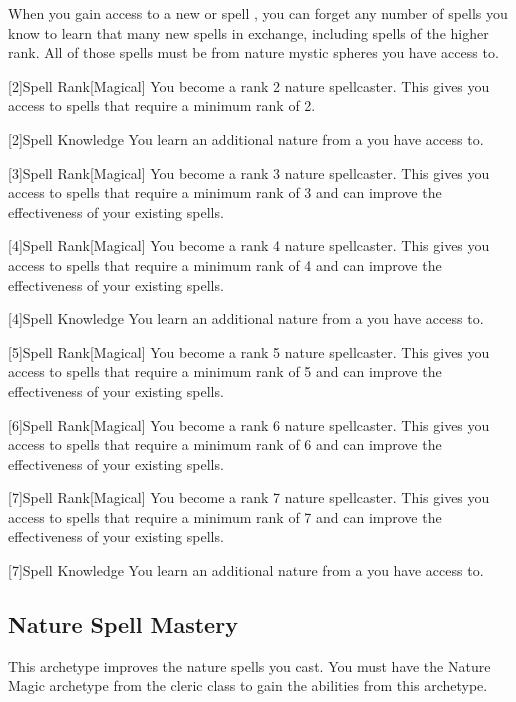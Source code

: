         When you gain access to a new  or spell ,
            you can forget any number of spells you know to learn that many new spells in exchange,
            including spells of the higher rank.
        All of those spells must be from nature mystic spheres you have access to.

        [2]{Spell Rank}[Magical] You become a rank 2 nature spellcaster.
        This gives you access to spells that require a minimum rank of 2.

        [2]{Spell Knowledge} You learn an additional nature  from a  you have access to.

        [3]{Spell Rank}[Magical] You become a rank 3 nature spellcaster.
        This gives you access to spells that require a minimum rank of 3 and can improve the effectiveness of your existing spells.

        [4]{Spell Rank}[Magical] You become a rank 4 nature spellcaster.
        This gives you access to spells that require a minimum rank of 4 and can improve the effectiveness of your existing spells.

        [4]{Spell Knowledge} You learn an additional nature  from a  you have access to.

        [5]{Spell Rank}[Magical] You become a rank 5 nature spellcaster.
        This gives you access to spells that require a minimum rank of 5 and can improve the effectiveness of your existing spells.

        [6]{Spell Rank}[Magical] You become a rank 6 nature spellcaster.
        This gives you access to spells that require a minimum rank of 6 and can improve the effectiveness of your existing spells.

        [7]{Spell Rank}[Magical] You become a rank 7 nature spellcaster.
        This gives you access to spells that require a minimum rank of 7 and can improve the effectiveness of your existing spells.

        [7]{Spell Knowledge} You learn an additional nature  from a  you have access to.

    \newpage
    \subsection{Nature Spell Mastery}
        This archetype improves the nature spells you cast.
        You must have the Nature Magic archetype from the cleric class to gain the abilities from this archetype.

